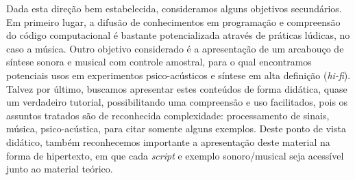 Dada esta direção bem estabelecida, consideramos alguns objetivos secundários. Em primeiro lugar, a difusão de conhecimentos em programação e compreensão do código computacional é bastante potencializada através de práticas lúdicas, no caso a música. Outro objetivo considerado é a apresentação de um arcabouço de síntese sonora e musical com controle amostral, para o qual encontramos potenciais usos em experimentos psico-acústicos e síntese em alta definição (\emph{hi-fi}). Talvez por último, buscamos apresentar estes conteúdos de forma didática, quase um verdadeiro tutorial, possibilitando uma compreensão e uso facilitados, pois os assuntos tratados são de reconhecida complexidade: processamento de sinais, música, psico-acústica, para citar somente alguns exemplos. Deste ponto de vista didático, também reconhecemos importante a apresentação deste material na forma de hipertexto, em que cada \emph{script} e exemplo sonoro/musical seja acessível junto ao material teórico.
  
